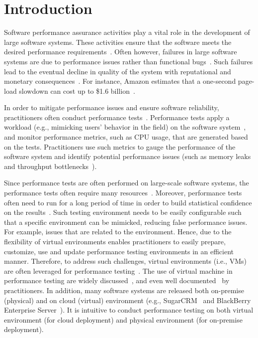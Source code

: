 \documentclass[smallextended]{svjour3}       %
\begin{document}
\section{Introduction}

Software performance assurance activities play a vital role in the development of large software systems. These activities ensure that the software meets the desired performance requirements~\cite{futureofspe}. Often however, failures in large software systems are due to performance issues rather than functional bugs~\cite{tailatscale, foo2010mining}. Such failures lead to the eventual decline in quality of the system with reputational and monetary consequences~\cite{costofdowntime}. For instance, Amazon estimates that a one-second page-load slowdown can cost up to \$1.6 billion~\cite{amazononesec}. 

In order to mitigate performance issues and ensure software reliability, practitioners often conduct performance tests~\cite{futureofspe}. Performance tests apply a workload (e.g., mimicking users' behavior in the field) on the software system~\cite{ranjanbook,Syer2016}, and monitor performance metrics, such as CPU usage, that are generated based on the tests. Practitioners use such metrics to gauge the performance of the software system and identify potential performance issues (such as memory leaks~\cite{markicsm2013} and throughput bottlenecks~\cite{5635038}).

Since performance tests are often performed on large-scale software systems, the performance tests often require many resources~\cite{ranjanbook}. Moreover, performance tests often need to run for a long period of time in order to build statistical confidence on the results~\cite{ranjanbook}. Such testing environment needs to be easily configurable such that a specific environment can be mimicked, reducing false performance issues. For example, issues that are related to the environment. Hence, due to the flexibility of virtual environments enables practitioners to easily prepare, customize, use and update performance testing environments in an efficient manner. Therefore, to address such challenges, virtual environments (i.e., VMs) are often leveraged for performance testing~\cite{whyvirtualisbetter, vmwarehighcost}. The use of virtual machine in performance testing are widely discussed~\cite{performanceonvvirtual, stackoverflow, windowsserver}, and even well documented~\cite{sugarcrmexp} by practitioners. In addition, many software systems are released both on-premise (physical) and on cloud (virtual) environment (e.g., SugarCRM~\cite{sugarcrm} and BlackBerry Enterprise Server~\cite{bes}). It is intuitive to conduct performance testing on both virtual environment (for cloud deployment) and physical environment (for on-premise deployment).
\end{document}
